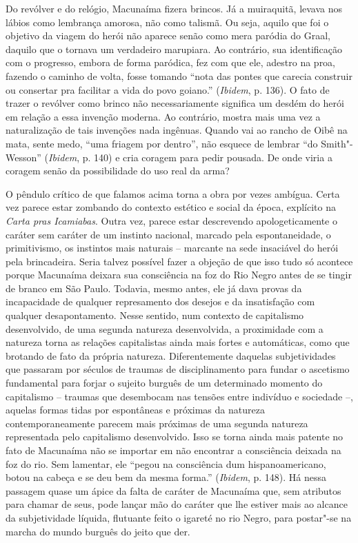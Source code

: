 Do revólver e do relógio, Macunaíma fizera brincos. Já a muiraquitã,
levava nos lábios como lembrança amorosa, não como talismã. Ou seja,
aquilo que foi o objetivo da viagem do herói não aparece senão como mera
paródia do Graal, daquilo que o tornava um verdadeiro marupiara. Ao
contrário, sua identificação com o progresso, embora de forma paródica,
fez com que ele, adestro na proa, fazendo o caminho de volta, fosse
tomando ``nota das pontes que carecia construir ou consertar pra
facilitar a vida do povo goiano.'' (\emph{Ibidem}, p. 136). O fato de
trazer o revólver como brinco não necessariamente significa um desdém do
herói em relação a essa invenção moderna. Ao contrário, mostra mais uma
vez a naturalização de tais invenções nada ingênuas. Quando vai ao
rancho de Oibê na mata, sente medo, ``uma friagem por dentro'', não
esquece de lembrar ``do Smith"-Wesson'' (\emph{Ibidem}, p. 140) e cria
coragem para pedir pousada. De onde viria a coragem senão da
possibilidade do uso real da arma?

O pêndulo crítico de que falamos acima torna a obra por vezes ambígua.
Certa vez parece estar zombando do contexto estético e social da época,
explícito na \emph{Carta pras Icamiabas}. Outra vez, parece estar
descrevendo apologeticamente o caráter sem caráter de um instinto
nacional, marcado pela espontaneidade, o primitivismo, os instintos mais
naturais -- marcante na sede insaciável do herói pela brincadeira. Seria
talvez possível fazer a objeção de que isso tudo só acontece porque
Macunaíma deixara sua consciência na foz do Rio Negro antes de se tingir
de branco em São Paulo. Todavia, mesmo antes, ele já dava provas da
incapacidade de qualquer represamento dos desejos e da insatisfação com
qualquer desapontamento. Nesse sentido, num contexto de capitalismo
desenvolvido, de uma segunda natureza desenvolvida, a proximidade com a
natureza torna as relações capitalistas ainda mais fortes e automáticas,
como que brotando de fato da própria natureza. Diferentemente daquelas
subjetividades que passaram por séculos de traumas de disciplinamento
para fundar o ascetismo fundamental para forjar o sujeito burguês de um
determinado momento do capitalismo -- traumas que desembocam nas tensões
entre indivíduo e sociedade --, aquelas formas tidas por espontâneas e
próximas da natureza contemporaneamente parecem mais próximas de uma
segunda natureza representada pelo capitalismo desenvolvido. Isso se
torna ainda mais patente no fato de Macunaíma não se importar em não
encontrar a consciência deixada na foz do rio. Sem lamentar, ele ``pegou
na consciência dum hispanoamericano, botou na cabeça e se deu bem da
mesma forma.'' (\emph{Ibidem}, p. 148). Há nessa passagem quase um ápice
da falta de caráter de Macunaíma que, sem atributos para chamar de seus,
pode lançar mão do caráter que lhe estiver mais ao alcance da
subjetividade líquida, flutuante feito o igareté no rio Negro, para
postar"-se na marcha do mundo burguês do jeito que der.

